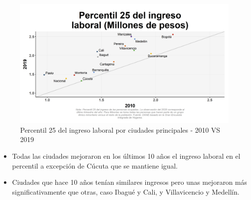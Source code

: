     \begin{figure}[H]
        \caption{Percentil 25 del ingreso laboral por ciudades principales - 2010 VS 2019 \label{map_result_2} }
        \begin{center}
        \includegraphics[width=\textwidth,keepaspectratio]{img/var_2_scatter_time.png}
        \end{center}
    \end{figure}
            \begin{itemize}
                    \item Todas las ciudades mejoraron en los últimos 10 años el ingreso laboral en el percentil a excepción de Cúcuta que se mantiene igual.
                    \item Ciudades que hace 10 años tenían similares ingresos pero unas mejoraron más significativamente que otras, caso Ibagué y Cali, y Villavicencio y Medellín.
                \end{itemize}

